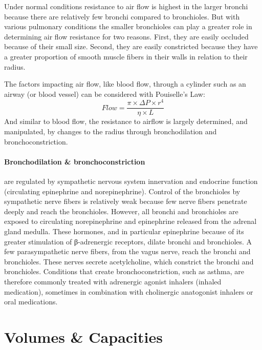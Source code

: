 Under normal conditions resistance to air flow is highest in the larger bronchi because there are relatively few bronchi compared to bronchioles. But with various pulmonary conditions the smaller bronchioles can play a greater role in determining air flow resistance for two reasons. First, they are easily occluded because of their small size. Second, they are easily constricted because they have a greater proportion of smooth muscle fibers in their walls in relation to their radius.

The factors impacting air flow, like blood flow, through a cylinder such as an airway (or blood vessel) can be considered with Pouiselle's Law:
\vspace{3mm}
\begin{equation}
    Flow = \frac{\pi \times \Delta P \times r^4}{\eta \times L}
\end{equation}
\vspace{3mm}
And similar to blood flow, the resistance to airflow is largely determined, and manipulated, by changes to the radius through bronchodilation and bronchoconstriction.


\paragraph{Bronchodilation \& bronchoconstriction} are regulated by sympathetic nervous system innervation and endocrine function (circulating epinephrine and norepinephrine). Control of the bronchioles by sympathetic nerve fibers is relatively weak because few nerve fibers penetrate deeply and reach the bronchioles. However, all bronchi and bronchioles are exposed to circulating norepinephrine and epinephrine released from the adrenal gland medulla. These hormones, and in particular epinephrine because of its greater stimulation of β-adrenergic receptors, dilate bronchi and bronchioles. A few parasympathetic nerve fibers, from the vagus nerve, reach the bronchi and bronchioles. These nerves secrete acetylcholine, which constrict the bronchi and bronchioles. 
Conditions that create bronchoconstriction, such as asthma, are therefore commonly treated with adrenergic agonist inhalers (inhaled medication), sometimes in combination with cholinergic anatogonist inhalers or oral medications.  

\section{Volumes \& Capacities}

